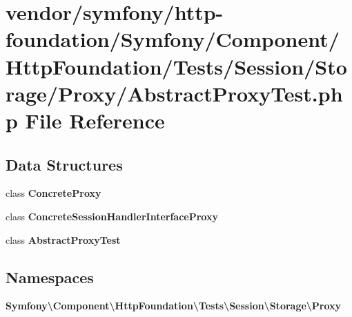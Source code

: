\section{vendor/symfony/http-\/foundation/\+Symfony/\+Component/\+Http\+Foundation/\+Tests/\+Session/\+Storage/\+Proxy/\+Abstract\+Proxy\+Test.php File Reference}
\label{_abstract_proxy_test_8php}
\subsection*{Data Structures}
\begin{DoxyCompactItemize}
\item 
class {\bf Concrete\+Proxy}
\item 
class {\bf Concrete\+Session\+Handler\+Interface\+Proxy}
\item 
class {\bf Abstract\+Proxy\+Test}
\end{DoxyCompactItemize}
\subsection*{Namespaces}
\begin{DoxyCompactItemize}
\item 
 {\bf Symfony\textbackslash{}\+Component\textbackslash{}\+Http\+Foundation\textbackslash{}\+Tests\textbackslash{}\+Session\textbackslash{}\+Storage\textbackslash{}\+Proxy}
\end{DoxyCompactItemize}
